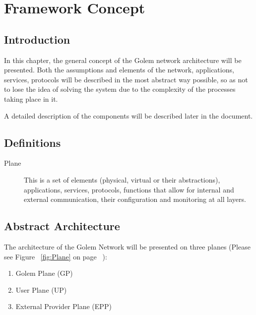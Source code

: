 \section{Framework Concept}

\subsection{Introduction}

In this chapter, the general concept of the Golem network architecture will be presented. 
Both the assumptions and elements of the network, applications, services, protocols will be 
described in the most abstract way possible, so as not to lose the idea of ​​solving the system 
due to the complexity of the processes taking place in it.

A detailed description of the components will be described later in the document.

\subsection{Definitions}

\begin{description}

\item[Plane] This is a set of elements (physical, virtual or their abstractions),
applications, services, protocols, functions that allow for internal
and external communication, their configuration and monitoring at all layers.

\end{description}

\subsection{Abstract Architecture}

The architecture of the Golem Network will be presented on three planes 
(Please see Figure ~\ref{fig:Plane} on page ~\pageref{fig:Plane}):

\begin{enumerate}
	\item Golem Plane (GP)
	\item User Plane (UP)
	\item External Provider Plane (EPP)
\end{enumerate}

